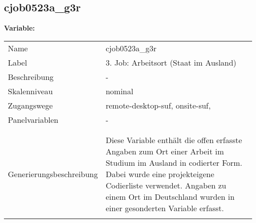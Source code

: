	
	
	\subsection{cjob0523a\_g3r}
	\label{subSection:cjob0523a_g3r}

	\noindent\textbf{Variable:}\\
		\begin{tabular}{lL{11.3cm}}
			\label{tableVariable:cjob0523a_g3r}
			Name & cjob0523a\_g3r \\
			Label & 3. Job: Arbeitsort (Staat im Ausland) \\
			Beschreibung & - \\
			Skalenniveau & nominal \\
			Zugangswege &
				remote-desktop-suf,
				onsite-suf,
 \\
			Panelvariablen & -
			 \\
			 \\
 \\
					Generierungsbeschreibung & Diese Variable enthält die offen erfasste Angaben zum Ort einer Arbeit im Studium im Ausland in codierter Form. Dabei wurde eine projekteigene Codierliste verwendet. Angaben zu einem Ort im Deutschland wurden in einer gesonderten Variable erfasst. 
				 \\	
			 \\
		\end{tabular}






